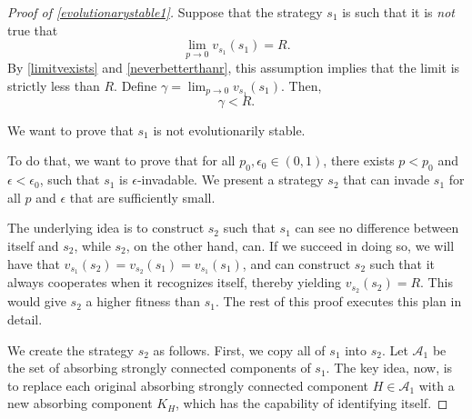\documentclass[12pt]{article}
\theoremstyle{definition}
\theoremstyle{remark}
\begin{document}
    \begin{proof}[Proof of \cref{evolutionarystable1}]
      Suppose that the strategy $s_1$ is such that it is \textit{not} true that \begin{equation*}
        \lim_{p \to 0 } v_{s_1}(s_1) = R.
      \end{equation*}
      By \cref{limitvexists} and \cref{neverbetterthanr}, this assumption implies that the limit is strictly less than $R$. Define $\gamma = \lim_{p \to 0} v_{s_1}(s_1)$. Then,
      \begin{equation*}
        \gamma < R.
      \end{equation*}
      
      We want to prove that $s_1$ is not evolutionarily stable. 
      
      To do that, we want to prove that for all $p_0, \epsilon_0 \in (0,1)$, there exists $p < p_0$ and $\epsilon < \epsilon_0$, such that $s_1$ is $\epsilon$-invadable. We present a strategy $s_2$ that can invade $s_1$ for all $p$ and $\epsilon$ that are sufficiently small.


      The underlying idea is to construct $s_2$ such that $s_1$ can see no difference between itself and $s_2$, while $s_2$, on the other hand, can. If we succeed in doing so, we will have that $v_{s_1}(s_2) = v_{s_2}(s_1) = v_{s_1}(s_1)$, and can construct $s_2$ such that it always cooperates when it recognizes itself, thereby yielding $v_{s_2}(s_2) = R$. This would give $s_2$ a higher fitness than $s_1$. The rest of this proof executes this plan in detail.

      We create the strategy $s_2$ as follows. First, we copy all of $s_1$ into $s_2$. Let $\mathcal{A}_1$ be the set of
       absorbing strongly connected components of $s_1$. The key idea, now, is to replace each original absorbing strongly connected component $H \in \mathcal{A}_1$ with a new absorbing component $K_H$, which has the capability of identifying itself.


\end{proof}
\end{document}

